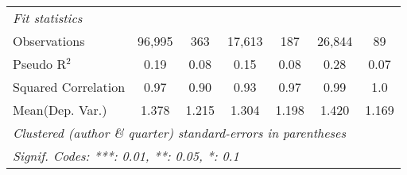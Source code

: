 \begin{tabular}{lcccccc}
   \midrule
   \emph{Fit statistics}\\
   Observations                                               & 96,995  & 363         & 17,613       & 187            & 26,844       & 89\\  
   Pseudo R$^2$                                               & 0.19    & 0.08        & 0.15         & 0.08           & 0.28         & 0.07\\  
   Squared Correlation                                        & 0.97    & 0.90        & 0.93         & 0.97           & 0.99         & 1.0\\  
Mean(Dep. Var.) & 1.378 & 1.215 & 1.304 & 1.198 & 1.420 & 1.169 \\
   \midrule \midrule
   \multicolumn{7}{l}{\emph{Clustered (author \& quarter) standard-errors in parentheses}}\\
   \multicolumn{7}{l}{\emph{Signif. Codes: ***: 0.01, **: 0.05, *: 0.1}}\\
\end{tabular}
\par\endgroup
